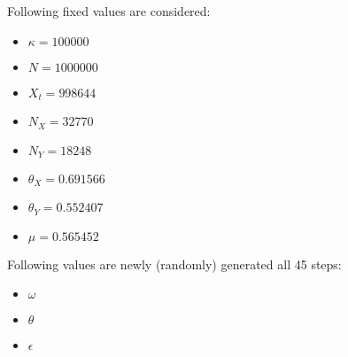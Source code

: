 Following fixed values are considered:
\begin{itemize}
\item $\kappa = 100000$
\item $N = 1000000$
\item $X_t = 998644$
\item $N_X = 32770$
\item $N_Y = 18248$
\item $\theta_X = 0.691566$
\item $\theta_Y = 0.552407$
\item $\mu = 0.565452$
\end{itemize}
Following values are newly (randomly) generated all 45 steps:
\begin{itemize}
\item $\omega$
\item $\theta$
\item $\epsilon$
\end{itemize}
